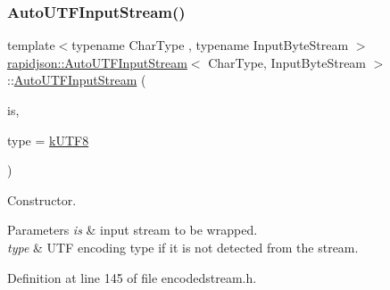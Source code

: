 \subsubsection{\texorpdfstring{AutoUTFInputStream()}{AutoUTFInputStream()}\hspace{0.1cm}{\footnotesize\ttfamily [1/2]}}
{\footnotesize\ttfamily template$<$typename Char\+Type , typename Input\+Byte\+Stream $>$ \\
\mbox{\hyperlink{classrapidjson_1_1_auto_u_t_f_input_stream}{rapidjson\+::\+Auto\+U\+T\+F\+Input\+Stream}}$<$ Char\+Type, Input\+Byte\+Stream $>$\+::\mbox{\hyperlink{classrapidjson_1_1_auto_u_t_f_input_stream}{Auto\+U\+T\+F\+Input\+Stream}} (\begin{DoxyParamCaption}\item[{Input\+Byte\+Stream \&}]{is,  }\item[{\mbox{\hyperlink{namespacerapidjson_a4aacabc0f8cea1cd628f466d890773eb}{U\+T\+F\+Type}}}]{type = {\ttfamily \mbox{\hyperlink{namespacerapidjson_a4aacabc0f8cea1cd628f466d890773eba3bda3a2e3f0ec2b7e8c5a3d5d4f60a81}{k\+U\+T\+F8}}} }\end{DoxyParamCaption})}



Constructor. 


\begin{DoxyParams}{Parameters}
{\em is} & input stream to be wrapped. \\
\hline
{\em type} & U\+TF encoding type if it is not detected from the stream. \\
\hline
\end{DoxyParams}


Definition at line 145 of file encodedstream.\+h.


